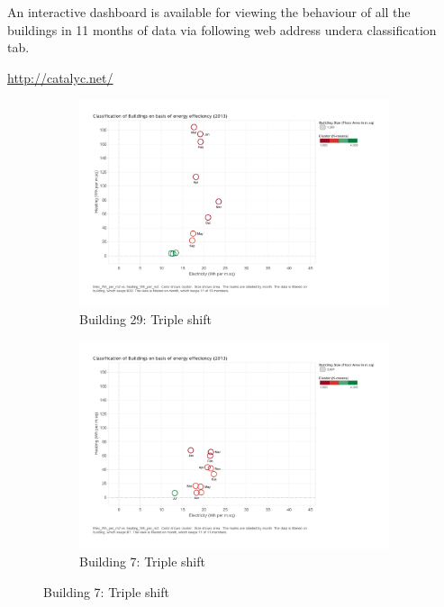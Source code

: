 An interactive dashboard is available for viewing the behaviour of all the buildings in 11 months of data via following web address undera classification tab.

\url{http://catalyc.net/}
   

\begin{figure}
        \centering
        \begin{subfigure}[b]{0.45\textwidth}
                \includegraphics[width=\textwidth]{images/kmeans_b29_3c.pdf}
                \caption{Building 29:  Triple shift}
                \label{fig:tri_1}
        \end{subfigure}%
        \begin{subfigure}[b]{0.45\textwidth}
                \includegraphics[width=\textwidth]{images/kmeans_b7.pdf}
                \caption{Building 7: Triple shift}
                \label{fig:tri_2}
        \end{subfigure}
        

\end{figure}
